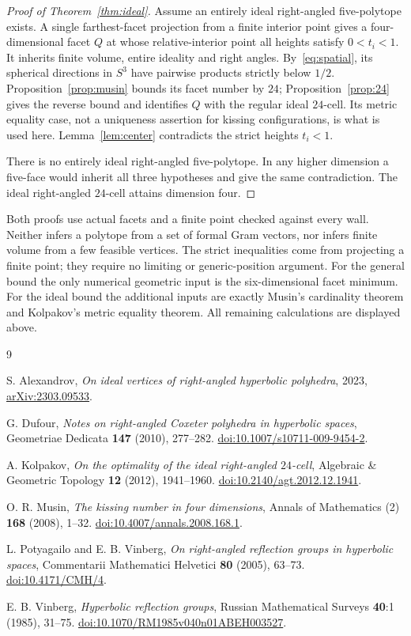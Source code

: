 \documentclass[11pt]{article}
\theoremstyle{remark}
\begin{document}
\begin{proof}[Proof of Theorem~\ref{thm:ideal}]
Assume an entirely ideal right-angled five-polytope exists. A single
farthest-facet projection from a finite interior point gives a
four-dimensional facet $Q$ at whose relative-interior point all heights satisfy
$0<t_i<1$. It inherits finite volume, entire ideality and right angles.
By~\eqref{eq:spatial}, its spherical directions in $S^3$ have
pairwise products strictly below $1/2$. Proposition~\ref{prop:musin}
bounds its facet number by $24$; Proposition~\ref{prop:24} gives the
reverse bound and identifies $Q$ with the regular ideal $24$-cell.
Its metric equality case, not a uniqueness assertion for kissing
configurations, is what is used here. Lemma~\ref{lem:center}
contradicts the strict heights $t_i<1$.

There is no entirely ideal right-angled five-polytope. In any higher
dimension a five-face would inherit all three hypotheses and give
the same contradiction. The ideal right-angled $24$-cell attains
dimension four.
\end{proof}

Both proofs use actual facets and a finite point checked against
every wall. Neither infers a polytope from a set of formal Gram
vectors, nor infers finite volume from a few feasible vertices.
The strict inequalities come from projecting a finite point;
they require no limiting or generic-position argument. For the
general bound the only numerical geometric input is the
six-dimensional facet minimum. For the ideal bound the additional
inputs are exactly Musin's cardinality theorem and Kolpakov's metric
equality theorem. All remaining calculations are displayed above.

\begin{thebibliography}{9}
\raggedright
{}
S. Alexandrov, \emph{On ideal vertices of right-angled hyperbolic
polyhedra}, 2023, \href{https://arxiv.org/abs/2303.09533}{arXiv:2303.09533}.

G. Dufour, \emph{Notes on right-angled Coxeter polyhedra in hyperbolic
spaces}, Geometriae Dedicata \textbf{147} (2010), 277--282.
\href{https://doi.org/10.1007/s10711-009-9454-2}{doi:10.1007/s10711-009-9454-2}.

A. Kolpakov, \emph{On the optimality of the ideal right-angled
$24$-cell}, Algebraic \& Geometric Topology \textbf{12} (2012),
1941--1960.
\href{https://doi.org/10.2140/agt.2012.12.1941}{doi:10.2140/agt.2012.12.1941}.

O. R. Musin, \emph{The kissing number in four dimensions}, Annals of
Mathematics (2) \textbf{168} (2008), 1--32.
\href{https://doi.org/10.4007/annals.2008.168.1}{doi:10.4007/annals.2008.168.1}.

L. Potyagailo and E. B. Vinberg, \emph{On right-angled reflection
groups in hyperbolic spaces}, Commentarii Mathematici Helvetici
\textbf{80} (2005), 63--73.
\href{https://doi.org/10.4171/CMH/4}{doi:10.4171/CMH/4}.

E. B. Vinberg, \emph{Hyperbolic reflection groups}, Russian Mathematical
Surveys \textbf{40}:1 (1985), 31--75.
\href{https://doi.org/10.1070/RM1985v040n01ABEH003527}{doi:10.1070/RM1985v040n01ABEH003527}.
\end{thebibliography}
\end{document}
